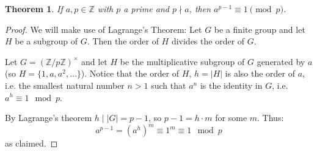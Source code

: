 \documentclass[12pt]{article}
\newtheorem*{thm2}{Theorem}
\newcommand{\Ints}{\mathbb{Z}}
\begin{document}
\begin{thm2}
If $a, p \in \mathbb{Z}$ with $p$ a prime and $p \nmid a$, then $a^{p-1} \equiv 1 \pmod{p}$.
\end{thm2}
\begin{proof}
We will make use of Lagrange's Theorem: Let $G$ be a finite group and let $H$ be a subgroup of $G$. Then the order of $H$ divides the order of $G$. 

Let $G=(\Ints/p\Ints)^\times$ and let $H$ be the multiplicative subgroup of $G$ generated by $a$ (so $H=\{ 1, a ,a^2,\ldots \}$). Notice that the order of $H$, $h=|H|$ is also the order of $a$, i.e. the smallest natural number $n>1$ such that $a^n$ is the identity in $G$, i.e. $a^h\equiv 1 \mod p$. 

By Lagrange's theorem $h \mid |G|=p-1$, so $p-1=h\cdot m$ for some $m$. Thus:
$$a^{p-1}=(a^h)^m\equiv 1^m \equiv 1 \mod p$$
as claimed.
\end{proof}
\end{document}
